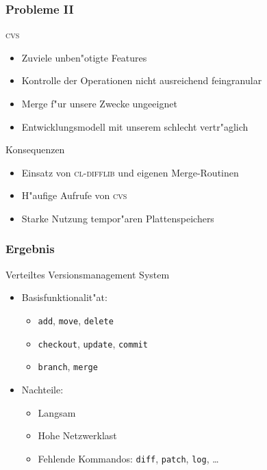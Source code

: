 \documentclass[german, presentation]{beamer}
\begin{document}
\begin{frame} \frametitle{Probleme II}
  \begin{block}{\textsc{cvs}}
    \begin{itemize}
    \item Zuviele unben"otigte Features
    \item Kontrolle der Operationen nicht ausreichend feingranular
    \item Merge f"ur unsere Zwecke ungeeignet
    \item Entwicklungsmodell mit unserem schlecht vertr"aglich
    \end{itemize}
  \end{block}
  \begin{block}{Konsequenzen}
    \begin{itemize}
    \item Einsatz von \textsc{cl-difflib} und eigenen Merge-Routinen
    \item H"aufige Aufrufe von \textsc{cvs}
    \item Starke Nutzung tempor"aren Plattenspeichers
    \end{itemize}
  \end{block}
\end{frame}


\begin{frame} \frametitle{Ergebnis}
  \begin{block}{Verteiltes Versionsmanagement System}
    \begin{itemize}
    \item Basisfunktionalit"at:
      \begin{itemize}
      \item \texttt{add}, \texttt{move}, \texttt{delete}
      \item \texttt{checkout}, \texttt{update}, \texttt{commit}
      \item \texttt{branch}, \texttt{merge}
      \end{itemize}
    \item Nachteile:
      \begin{itemize}
      \item Langsam
      \item Hohe Netzwerklast
      \item Fehlende Kommandos: \texttt{diff}, \texttt{patch},
        \texttt{log}, \ldots
      \end{itemize}
    \end{itemize}
  \end{block}
\end{frame}
\end{document}
